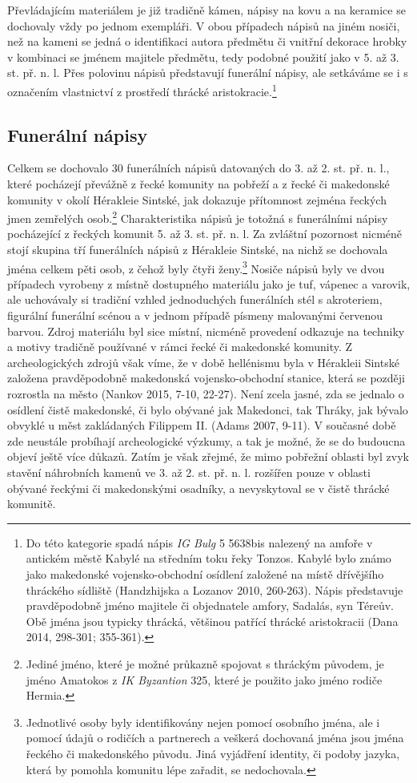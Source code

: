 Převládajícím materiálem je již tradičně kámen, nápisy na kovu a na keramice se dochovaly vždy po jednom exempláři. V obou případech nápisů na jiném nosiči, než na kameni se jedná o identifikaci autora předmětu či vnitřní dekorace hrobky v kombinaci se jménem majitele předmětu, tedy podobné použití jako v 5. až 3. st. př. n. l. Přes polovinu nápisů představují funerální nápisy, ale setkáváme se i s označením vlastnictví z prostředí thrácké aristokracie.\footnote{Do této kategorie spadá nápis {\em IG Bulg} 5 5638bis nalezený na amfoře v antickém městě Kabylé na středním toku řeky Tonzos. Kabylé bylo známo jako makedonské vojensko-obchodní osídlení založené na místě dřívějšího thráckého sídliště (Handzhijska a Lozanov 2010, 260-263). Nápis představuje pravděpodobně jméno majitele či objednatele amfory, Sadalás, syn Téreův. Obě jména jsou typicky thrácká, většinou patřící thrácké aristokracii (Dana 2014, 298-301; 355-361).}

\subsection[funerální-nápisy-6]{Funerální nápisy}

Celkem se dochovalo 30 funerálních nápisů datovaných do 3. až 2. st. př. n. l., které pocházejí převážně z řecké komunity na pobřeží a z řecké či makedonské komunity v okolí Hérakleie Sintské, jak dokazuje přítomnost zejména řeckých jmen zemřelých osob.\footnote{Jediné jméno, které je možné průkazně spojovat s thráckým původem, je jméno Amatokos z {\em IK Byzantion} 325, které je použito jako jméno rodiče Hermia.} Charakteristika nápisů je totožná s funerálními nápisy pocházející z řeckých komunit 5. až 3. st. př. n. l. Za zvláštní pozornost nicméně stojí skupina tří funerálních nápisů z Hérakleie Sintské, na nichž se dochovala jména celkem pěti osob, z čehož byly čtyři ženy.\footnote{Jednotlivé osoby byly identifikovány nejen pomocí osobního jména, ale i pomocí údajů o rodičích a partnerech a veškerá dochovaná jména jsou jména řeckého či makedonského původu. Jiná vyjádření identity, či podoby jazyka, která by pomohla komunitu lépe zařadit, se nedochovala.} Nosiče nápisů byly ve dvou případech vyrobeny z místně dostupného materiálu jako je tuf, vápenec a varovik, ale uchovávaly si tradiční vzhled jednoduchých funerálních stél s akroteriem, figurální funerální scénou a v jednom případě písmeny malovanými červenou barvou. Zdroj materiálu byl sice místní, nicméně provedení odkazuje na techniky a motivy tradičně používané v rámci řecké či makedonské komunity. Z archeologických zdrojů však víme, že v době hellénismu byla v Hérakleii Sintské založena pravděpodobně makedonská vojensko-obchodní stanice, která se později rozrostla na město (Nankov 2015, 7-10, 22-27). Není zcela jasné, zda se jednalo o osídlení čistě makedonské, či bylo obývané jak Makedonci, tak Thráky, jak bývalo obvyklé u měst zakládaných Filippem II. (Adams 2007, 9-11). V současné době zde neustále probíhají archeologické výzkumy, a tak je možné, že se do budoucna objeví ještě více důkazů. Zatím je však zřejmé, že mimo pobřežní oblasti byl zvyk stavění náhrobních kamenů ve 3. až 2. st. př. n. l. rozšířen pouze v oblasti obývané řeckými či makedonskými osadníky, a nevyskytoval se v čistě thrácké komunitě.

